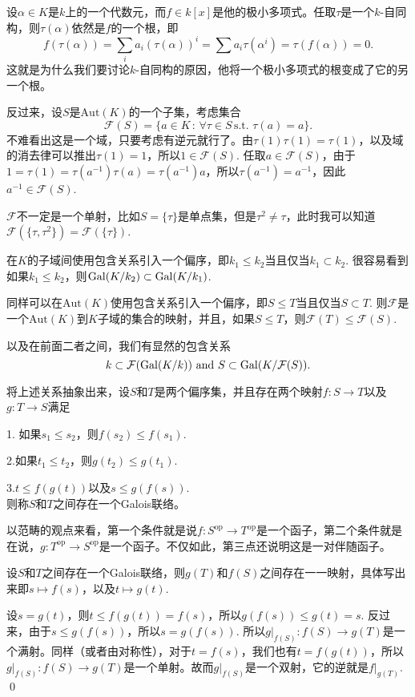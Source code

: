 设$\alpha\in K$是$k$上的一个代数元，而$f\in k[x]$是他的极小多项式。任取$\tau$是一个$k$-自同构，则$\tau(\alpha)$依然是$f$的一个根，即
\[
	f(\tau(\alpha))=\sum_i a_i (\tau(\alpha))^i=\sum a_i \tau(\alpha^i)=\tau(f(\alpha))=0.
\]
这就是为什么我们要讨论$k$-自同构的原因，他将一个极小多项式的根变成了它的另一个根。

\para 反过来，设$S$是$\mathrm{Aut}(K)$的一个子集，考虑集合
\[
	\mathcal{F}(S)=\{a\in K\,:\, \forall \tau\in S\,\text{s.t. }\tau(a)=a\}.
\]
不难看出这是一个域，只要考虑有逆元就行了。由$\tau(1)\tau(1)=\tau(1)$，以及域的消去律可以推出$\tau(1)=1$，所以$1\in \mathcal{F}(S)$. 
任取$a\in \mathcal{F}(S)$，由于$1=\tau(1)=\tau(a^{-1})\tau(a)=\tau(a^{-1})a$，所以$\tau(a^{-1})=a^{-1}$，因此$a^{-1}\in \mathcal{F}(S)$.

$\mathcal{F}$不一定是一个单射，比如$S=\{\tau\}$是单点集，但是$\tau^2\neq \tau$，此时我可以知道$\mathcal{F}(\{\tau,\tau^2\})=\mathcal{F}(\{\tau\})$.

\para 在$K$的子域间使用包含关系引入一个偏序，即$k_1\leq k_2$当且仅当$k_1\subset k_2$. 很容易看到如果$k_1\leq k_2$，则$\operatorname{Gal}(K/k_2)\subset \operatorname{Gal}(K/k_1)$. 

同样可以在$\mathrm{Aut}(K)$使用包含关系引入一个偏序，即$S\leq T$当且仅当$S\subset T$. 则$\mathcal{F}$是一个$\mathrm{Aut}(K)$到$K$子域的集合的映射，并且，如果$S\leq T$，则$\mathcal{F}(T)\leq \mathcal{F}(S)$.

以及在前面二者之间，我们有显然的包含关系
\[
	k\subset \mathcal{F}(\operatorname{Gal}(K/k))\text{ and } S\subset \operatorname{Gal}(K/\mathcal{F}(S)).
\]

将上述关系抽象出来，设$S$和$T$是两个偏序集，并且存在两个映射$f:S\to T$以及$g:T\to S$满足

1. 如果$s_1\leq s_2$，则$f(s_2)\leq f(s_1)$.

2.如果$t_1\leq t_2$，则$g(t_2)\leq g(t_1)$.

3.$t\leq f(g(t))$以及$s\leq g(f(s))$.\\\noindent
则称$S$和$T$之间存在一个Galois联络。

以范畴的观点来看，第一个条件就是说$f:S^{\text{op}}\to T^{\text{op}}$是一个函子，第二个条件就是在说，$g:T^{\text{op}}\to S^{\text{op}}$是一个函子。不仅如此，第三点还说明这是一对伴随函子。

\para 设$S$和$T$之间存在一个Galois联络，则$g(T)$和$f(S)$之间存在一一映射，具体写出来即$s\mapsto f(s)$，以及$t \mapsto g(t)$.

\proof 
	设$s=g(t)$，则$t\leq f(g(t))=f(s)$，所以$g(f(s))\leq g(t)=s$. 反过来，由于$s\leq g(f(s))$，所以$s=g(f(s))$. 所以$g|_{f(S)}:f(S)\to g(T)$是一个满射。同样（或者由对称性），对于$t=f(s)$，我们也有$t=f(g(t))$，所以$g|_{f(S)}:f(S)\to g(T)$是一个单射。故而$g|_{f(S)}$是一个双射，它的逆就是$f|_{g(T)}$.
\qed


